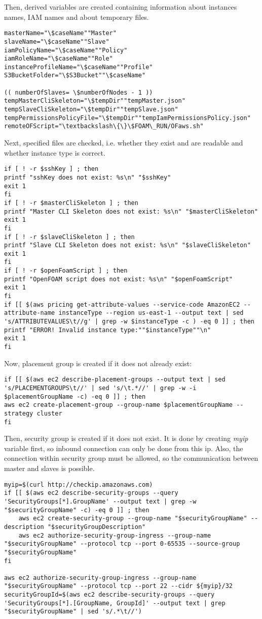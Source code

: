 \documentclass[12pt,english]{article}
\begin{document}
Then, derived variables are created containing information about instances names, IAM names and about temporary files.
\begin{lstlisting}
masterName="\$caseName""Master"
slaveName="\$caseName""Slave"
iamPolicyName="\$caseName""Policy"
iamRoleName="\$caseName""Role"
instanceProfileName="\$caseName""Profile"
S3BucketFolder="\$S3Bucket""\$caseName"

(( numberOfSlaves= \$numberOfNodes - 1 ))
tempMasterCliSkeleton="\$tempDir""tempMaster.json"
tempSlaveCliSkeleton="\$tempDir""tempSlave.json"
tempPermissionsPolicyFile="\$tempDir""tempIamPermissionsPolicy.json"
remoteOFScript="\textbackslash\{\}\$FOAM\_RUN/OFaws.sh"
\end{lstlisting}
Next, specified files are checked, i.e. whether they exist and are readable and whether instance type is correct.
\begin{lstlisting}
if [ ! -r $sshKey ] ; then
printf "sshKey does not exist: %s\n" "$sshKey"
exit 1
fi
if [ ! -r $masterCliSkeleton ] ; then
printf "Master CLI Skeleton does not exist: %s\n" "$masterCliSkeleton"
exit 1
fi
if [ ! -r $slaveCliSkeleton ] ; then
printf "Slave CLI Skeleton does not exist: %s\n" "$slaveCliSkeleton"
exit 1
fi
if [ ! -r $openFoamScript ] ; then
printf "OpenFOAM script does not exist: %s\n" "$openFoamScript"
exit 1
fi
if [[ $(aws pricing get-attribute-values --service-code AmazonEC2 --attribute-name instanceType --region us-east-1 --output text | sed 's/ATTRIBUTEVALUES\t//g' | grep -w $instanceType -c ) -eq 0 ]] ; then
printf "ERROR! Invalid instance type:""$instanceType""\n"
exit 1
fi
\end{lstlisting}
Now, placement group is created if it does not already exist:
\begin{lstlisting}
if [[ $(aws ec2 describe-placement-groups --output text | sed 's/PLACEMENTGROUPS\t//' | sed 's/\t.*//' | grep -w -i $placementGroupName -c) -eq 0 ]] ; then
aws ec2 create-placement-group --group-name $placementGroupName --strategy cluster
fi
\end{lstlisting}
Then, security group is created if it does not exist. It is done by creating \textit{myip} variable first, so inbound connection can only be done from this ip. Also, the connection within security group must be allowed, so the communication between master and slaves is possible.
\begin{lstlisting}
myip=$(curl http://checkip.amazonaws.com)
if [[ $(aws ec2 describe-security-groups --query 'SecurityGroups[*].GroupName' --output text | grep -w "$securityGroupName" -c) -eq 0 ]] ; then
	aws ec2 create-security-group --group-name "$securityGroupName" --description "$securityGroupDescription"
	aws ec2 authorize-security-group-ingress --group-name "$securityGroupName" --protocol tcp --port 0-65535 --source-group "$securityGroupName"
fi

aws ec2 authorize-security-group-ingress --group-name "$securityGroupName" --protocol tcp --port 22 --cidr ${myip}/32
securityGroupId=$(aws ec2 describe-security-groups --query 'SecurityGroups[*].[GroupName, GroupId]' --output text | grep "$securityGroupName" | sed 's/.*\t//')
\end{lstlisting}
\end{document}
